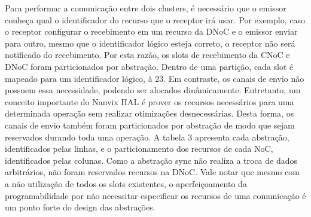 		Para performar a comunicação entre dois clusters, é necessário que o emissor conheça qual o identificador do recurso que o receptor irá usar.
		Por exemplo, caso o receptor configurar o recebimento em um recurso da DNoC e o emissor enviar para outro, mesmo que o identificador lógico esteja correto, o receptor não será notificado do recebimento.
		Por esta razão, os slots de recebimento da CNoC e DNoC foram particionados por abstração.
		Dentro de uma partição, cada slot é mapeado para um identificador lógico,  à 23.
		Em contraste, os canais de envio não possuem essa necessidade, podendo ser alocados dinâmicamente.
		Entretanto, um conceito importante do Nanvix HAL é prover os recursos necessários para uma determinada operação sem realizar otimizações desnecessárias.
		Desta forma, os canais de envio também foram particionados por abstração de modo que sejam reservados durando toda uma operação.
		A tabela 3 apresenta cada abstração, identificados pelas linhas, e o particionamento dos recursos de cada NoC, identificados pelas colunas.
		Como a abstração sync não realiza a troca de dados arbitrários, não foram reservados recursos na DNoC.
		Vale notar que mesmo com a não utilização de todos os slots existentes, o aperfeiçoamento da programabilidade por não necessitar especificar os recursos de uma comunicação é um ponto forte do design das abstrações.


